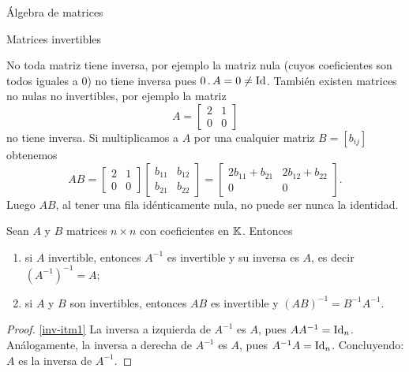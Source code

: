 \begin{chapter}{\'Algebra de matrices}
\begin{section}{Matrices invertibles}
            \begin{observacion*}
                No toda matriz tiene inversa, por ejemplo  la  matriz nula (cuyos coeficientes son todos iguales a $0$) no tiene inversa pues $0\,.\, A= 0 \not= \operatorname{Id}$.  También existen matrices no nulas no invertibles,  por ejemplo la matriz 
                \begin{equation*}
                A = \begin{bmatrix} 2&1\\ 0&0\end{bmatrix}
                \end{equation*}
                no tiene inversa.
                Si  multiplicamos a $A$ por una cualquier matriz  $B =[b_{ij}]$ obtenemos
                \begin{equation*}
                AB = \begin{bmatrix} 2&1\\ 0&0\end{bmatrix}
                \begin{bmatrix} b_{11}&b_{12}\\ b_{21}&b_{22}\end{bmatrix} =
                \begin{bmatrix} 2b_{11}+b_{21}&2b_{12}+b_{22}\\0 &0\end{bmatrix}.
                \end{equation*}
                Luego $AB$, al tener una fila idénticamente nula, no puede ser nunca la identidad. 
            \end{observacion*}
            
            
            
            \begin{teorema}\label{th-prod-inv-impl-inv}
                Sean $A$ y $B$ matrices $n \times n$ con coeficientes en $\mathbb K$. Entonces
                \begin{enumerate}
                    \item \label{inv-itm1} si $A$ invertible,  entonces $A^{-1}$  es invertible y su inversa es $A$,  es decir $(A^{-1})^{-1}=A$;
                    \item \label{inv-itm2} si $A$ y $B$ son invertibles, entonces $AB$ es invertible y $(AB)^{-1} = B^{-1}A^{-1}$.
                \end{enumerate}
            \end{teorema}
                \begin{proof}
                    \ref{inv-itm1} La inversa a izquierda de $A^{-1}$ es $A$, pues $AA^{-1}=\operatorname{Id}_n$. Análogamente, la inversa a derecha de $A^{-1}$ es $A$, pues $A^{-1}A = \operatorname{Id}_n$. Concluyendo: $A$  es la inversa de $A^{-1}$.
                    

\end{proof}
\end{section}
\end{chapter}
